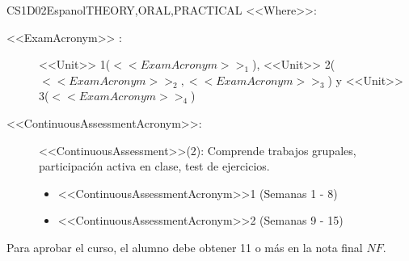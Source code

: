 \begin{evaluation}{CS1D02}{Espanol}{THEORY,ORAL,PRACTICAL}
  \vspace{2mm}
  \noindent <<Where>>:
  \begin{description}
    \item[<<ExamAcronym>> :] <<Unit>> 1($<<ExamAcronym>>_{1}$), <<Unit>> 2($<<ExamAcronym>>_{2}, <<ExamAcronym>>_{3}$) y <<Unit>> 3($<<ExamAcronym>>_{4}$)
    \item[<<ContinuousAssessmentAcronym>>:]<<ContinuousAssessment>>(2): Comprende trabajos grupales, participación activa en clase, test de ejercicios.
    \begin{itemize}
          \item <<ContinuousAssessmentAcronym>>1 (Semanas 1 - 8)
          \item <<ContinuousAssessmentAcronym>>2 (Semanas 9 - 15)
    \end{itemize}
  \end{description}

  \noindent Para aprobar el curso, el alumno debe obtener 11 o más en la nota final $NF$.
\end{evaluation}
 
